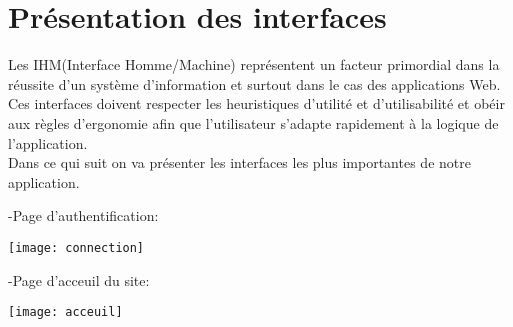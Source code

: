 \documentclass[a4paper,12pt,oneside]{report}
\begin{document}
  \section{Présentation des interfaces}
  Les IHM(Interface Homme/Machine) représentent un facteur primordial dans la réussite d'un système d'information et surtout dans le cas des applications Web.\\
  Ces interfaces doivent respecter les heuristiques d'utilité et d'utilisabilité et obéir aux règles d'ergonomie afin que l'utilisateur s'adapte rapidement à la logique de l'application.\\
  Dans ce qui suit on va présenter les interfaces les plus importantes de notre application.
 
-Page d'authentification:

 \begin{center}
\texttt{[image: connection]}

\label{fig1}
\end{center}
  \newpage
-Page d'acceuil du site: 
\begin{center}
\texttt{[image: acceuil]}
\label{fig1}
\end{center}
\end{document}
